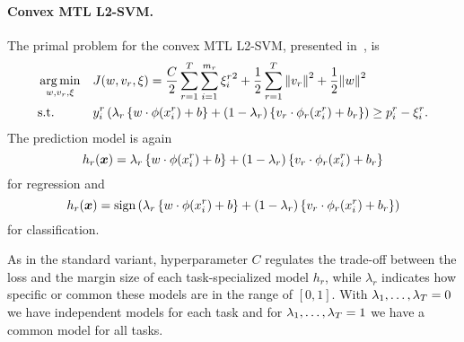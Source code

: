 \paragraph*{{Convex} MTL L2-SVM.\\}
The primal problem for the convex MTL L2-SVM, presented in~\cite{RuizAD21}, is
\begin{equation}\label{eq:svmmtl_primal_convex_l2}
    \begin{aligned}
    & \argmin_{w, {v}_r, \xi}
    & & {J({w}, {v}_r, \xi) = \frac{C}{2} \sum_{r= 1}^T \sum_{i=1}^{m_r} {\xi_{i}^r}^2 + \frac{1}{2} \sum_{r= 1}^T{\norm{{v}_r}^2} + \frac{1}{2} {\norm{{w}}}^2} \\
    & \text{s.t.}
    & & y_{i}^r \left(\lambda_r \left\lbrace {w} \cdot \phi(x_{i}^r) + b  \right\rbrace + (1 - \lambda_r) \left\lbrace {v}_r \cdot \phi_r(x_{i}^r) + b_r \right\rbrace  \right) \geq p_{i}^r - \xi_{i}^r .  \\
    \end{aligned}
\end{equation}
The prediction model is again
\begin{equation}
    \nonumber
    h_r(\bm{x}) = \lambda_r \left\lbrace {w} \cdot \phi(x_{i}^r) + b  \right\rbrace + (1 - \lambda_r) \left\lbrace {v}_r \cdot \phi_r(x_{i}^r) + b_r \right\rbrace
\end{equation}
for regression and 
\begin{equation}
    \nonumber
    h_r(\bm{x}) = \operatorname{sign}{ \left(\lambda_r \left\lbrace {w} \cdot \phi(x_{i}^r) + b  \right\rbrace + (1 - \lambda_r) \left\lbrace {v}_r \cdot \phi_r(x_{i}^r) + b_r \right\rbrace \right)}
\end{equation}
for classification.
%

As in the standard variant, hyperparameter $C$ regulates the trade-off between the loss and the margin size of each task-specialized model $h_r$, while $\lambda_r$ indicates how specific or common these models are in the range of $[0, 1]$. With $\lambda_1, \ldots, \lambda_T=0$ we have independent models for each task and for $\lambda_1, \ldots, \lambda_T=1$ we have a common model for all tasks. 
 


